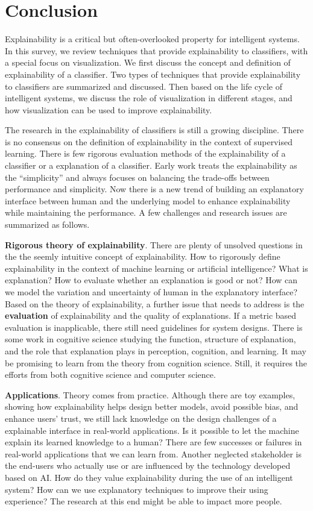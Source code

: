 \chapter{Conclusion}\label{sec-conclusion}

Explainability is a critical but often-overlooked property for intelligent systems. In this survey, we review techniques that provide explainability to classifiers, with a special focus on visualization. We first discuss the concept and definition of explainability of a classifier. Two types of techniques that provide explainability to classifiers are summarized and discussed. Then based on the life cycle of intelligent systems, we discuss the role of visualization in different stages, and how visualization can be used to improve explainability.

The research in the explainability of classifiers is still a growing discipline. There is no consensus on the definition of explainability in the context of supervised learning. There is few rigorous evaluation methods of the explainability of a classifier or a explanation of a classifier. Early work treats the explainability as the ``simplicity'' and always focuses on balancing the trade-offs between performance and simplicity. Now there is a new trend of building an explanatory interface between human and the underlying model to enhance explainability while maintaining the performance. A few challenges and research issues are summarized as follows.

\textbf{Rigorous theory of explainability}. There are plenty of unsolved questions in the the seemly intuitive concept of explainability. How to rigorously define explainability in the context of machine learning or artificial intelligence? What is explanation? How to evaluate whether an explanation is good or not? How can we model the variation and uncertainty of human in the explanatory interface? Based on the theory of explainability, a further issue that needs to address is the \textbf{evaluation} of explainability and the quality of explanations. If a metric based evaluation is inapplicable, there still need guidelines for system designs. There is some work in cognitive science studying the function, structure of explanation, and the role that explanation plays in perception, cognition, and learning. It may be promising to learn from the theory from cognition science. Still, it requires the efforts from both cognitive science and computer science.

\textbf{Applications}. Theory comes from practice. Although there are toy examples, showing how explainability helps design better models, avoid possible bias, and enhance users' trust, we still lack knowledge on the design challenges of a explainable interface in real-world applications. Is it possible to let the machine explain its learned knowledge to a human? There are few successes or failures in real-world applications that we can learn from. Another neglected stakeholder is the end-users who actually use or are influenced by the technology developed based on AI. How do they value explainability during the use of an intelligent system? How can we use explanatory techniques to improve their using experience? The research at this end might be able to impact more people.

